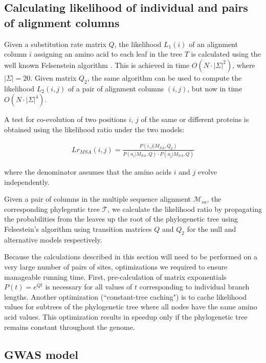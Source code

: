 \subsection{Calculating likelihood of individual and pairs of alignment columns}

Given a substitution rate matrix $Q$, the likelihood $L_1(i)$ of an alignment column $i$ assigning an amino acid to each leaf in the tree $T$ is calculated using the well known Felsenstein algorithm \cite{felsenstein2004inferring}. This is achieved in time $O(N \cdot |\Sigma|^2)$, where $|\Sigma|=20$. Given matrix $Q_2$, the same algorithm can be used to compute the likelihood $L_2(i,j)$ of a pair of alignment columns $(i,j)$, but now in time $O(N \cdot |\Sigma|^4)$. 

A test for co-evolution of two positions $i$, $j$ of the same or different proteins is obtained using the likelihood ratio under the two models: 

\begin{eqnarray*}
Lr_{MSA}(i,j) = \frac{P(i, j | M_{SA}, Q_2)}{P(a_i | M_{SA}, Q) \cdot P(a_j | M_{SA}, Q)}
\end{eqnarray*}

where the denominator assumes that the amino acids $i$ and $j$ evolve independently. 

Given a pair of columns in the multiple sequence alignment $\mathcal{M}_{sa}$, the corresponding phylegentic tree $\mathcal{T}$, we calculate the likelihood ratio by propagating the probabilities from the leaves up the root of the phylogenetic tree using Felsestein's algorithm \cite{felsenstein2004inferring} using transition matrices $Q$ and $Q_2$ for the null and alternative models respectively.

Because the calculations described in this section will need to be performed on a very large number of pairs of sites, optimizations we required to ensure manageable running time. First, pre-calculation of  matrix exponentials $P(t) = e^{Qt}$ is necessary for all values of $t$ corresponding to individual branch lengths. Another optimization (“constant-tree caching") is to cache likelihood values for subtrees of the phylogenetic tree where all nodes have the same amino acid values. This optimization results in speedup only if the phylogenetic tree remains constant throughout the genome.

\subsection{GWAS model}

